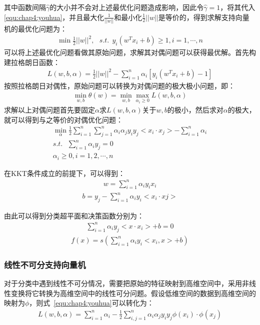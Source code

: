 其中函数间隔$\hat{\gamma}$的大小并不会对上述最优化问题造成影响，因此令$\hat{\gamma}=1$，将其代入\ref{equ:chap4:youhua}，并且最大化$\frac{1}{||w||}$和最小化$\frac{1}{2}||w||$是等价的，得到求解支持向量机的最优化问题为：
\begin{eqnarray}
\min\frac{1}{2}||w||^{2},~~~s.t. ~~ y_{i}(w^{T}x_{i}+b) \ge 1, i=1,\cdots,n
\end{eqnarray}
可以将上述最优化问题看做其原始问题，求解其对偶问题可以获得最优解。首先构建拉格朗日函数：
\begin{eqnarray}
\label{equ:chap4:youhua}
L(w,b,\alpha)=\frac{1}{2}||w||^{2}-\sum^{n}_{i=1}\alpha_{i}[y_{i}(w^{T}x_{i}+b)-1]
\end{eqnarray}
按照拉格朗日对偶性，原始问题可以转换为对偶问题的极大极小问题，即：
\begin{eqnarray}
\min_{w,b}\theta(w)=\min_{w,b}\max_{\alpha_{i}\ge 0}L(w,b,\alpha)
\end{eqnarray}
求解以上对偶问题首先要固定$\alpha$求$L(w,b,\alpha)$关于$w,b$的极小，然后求对$\alpha$的极大，就可以得到与之等价的对偶优化问题：
\begin{eqnarray}
\min_{\alpha}\frac{1}{2}\sum^{n}_{i=1}\sum^{n}_{j=1}\alpha_{i}\alpha_{j}y_{i}y_{j}<x_{i}\cdot x_{j}>-\sum^{n}_{i=1}\alpha_{i}\\
s.t. ~~~ \sum^{n}_{i=1}\alpha_{i}y_{j}=0\\
\alpha_{i} \ge 0, i=1,2,\cdots,n
\end{eqnarray}

在KKT条件成立的前提下，可以得到：
\begin{eqnarray}
w = \sum^{n}_{i=1}\alpha_{i}y_{i}x_{i}
\end{eqnarray}
\begin{eqnarray}
b = y_{j}-\sum^{n}_{i=1}\alpha_{i}y_{i}<x_{i}\cdot x{j}>
\end{eqnarray}

由此可以得到分类超平面和决策函数分别为：
\begin{eqnarray}
\sum^{n}_{i=1}\alpha_{i}y_{j}<x\cdot x_{i}>+b=0
\end{eqnarray}
\begin{eqnarray}
f(x)=s(\sum^{n}_{i=1}\alpha_{i}y_{i}<x_{i},x>+b)
\end{eqnarray}

\subsubsection{线性不可分支持向量机}

对于分类中遇到线性不可分情况，需要把原始的特征映射到高维空间中，采用非线性变换将它转换为高维空间中的线性可分问题。假设低维空间的数据到高维空间的映射为$\phi$，则式~\ref{equ:chap4:youhua}可以转化为：
\begin{eqnarray}
L(w,b,\alpha)=\sum^{n}_{i=1}\alpha_{i}-\frac{1}{2}\sum^{n}_{i,j=1}\alpha_{i}\alpha_{j}y_{i}y_{j}\phi(x_{i})\cdot\phi(x_{j})
\end{eqnarray}


